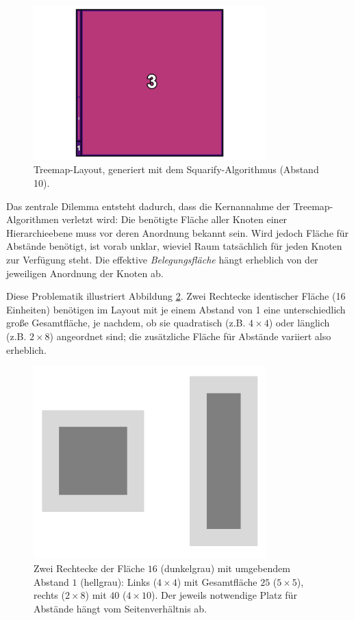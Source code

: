 \begin{figure}
    \centering
    \includegraphics[width=0.8\textwidth]{images/tenMarginArtifialMap.png}
    \caption{Treemap-Layout, generiert mit dem Squarify-Algorithmus (Abstand 10).}
    \label{fig:tenMarginArtificialMap}
\end{figure}

Das zentrale Dilemma entsteht dadurch, dass die Kernannahme der Treemap-Algorithmen verletzt wird: Die benötigte Fläche aller Knoten einer Hierarchieebene muss vor deren Anordnung bekannt sein. Wird jedoch Fläche für Abstände benötigt, ist vorab unklar, wieviel Raum tatsächlich für jeden Knoten zur Verfügung steht. Die effektive \textit{Belegungsfläche} hängt erheblich von der jeweiligen Anordnung der Knoten ab.

Diese Problematik illustriert Abbildung \ref{fig:marginAreaDifference}. Zwei Rechtecke identischer Fläche (16 Einheiten) benötigen im Layout mit je einem Abstand von 1 eine unterschiedlich große Gesamtfläche, je nachdem, ob sie quadratisch (z.B. $4 \times 4$) oder länglich (z.B. $2 \times 8$) angeordnet sind; die zusätzliche Fläche für Abstände variiert also erheblich.

\begin{figure}
    \centering
    \includegraphics[width=0.8\textwidth]{images/marginArea.png}
    \caption{Zwei Rechtecke der Fläche $16$ (dunkelgrau) mit umgebendem Abstand $1$ (hellgrau): Links ($4 \times 4$) mit Gesamtfläche $25$ ($5 \times 5$), rechts ($2 \times 8$) mit $40$ ($4 \times 10$). Der jeweils notwendige Platz für Abstände hängt vom Seitenverhältnis ab.}
    \label{fig:marginAreaDifference}
\end{figure}

